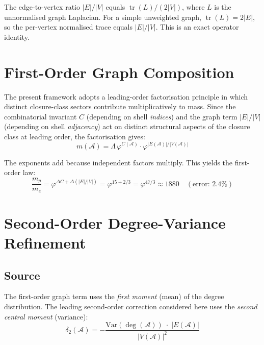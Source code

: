 \documentclass[12pt]{article}
\newcommand{\Acal}{\mathcal{A}}
\newcommand{\phig}{\varphi}
\begin{document}
The edge-to-vertex ratio $|E|/|V|$ equals $\operatorname{tr}(L)/(2|V|)$, where $L$ is the unnormalised graph Laplacian. For a simple unweighted graph, $\operatorname{tr}(L) = 2|E|$, so the per-vertex normalised trace equals $|E|/|V|$. This is an exact operator identity.

\section{First-Order Graph Composition}\label{sec:graphrule}

The present framework adopts a leading-order factorisation principle in which distinct closure-class sectors contribute multiplicatively to mass. Since the combinatorial invariant $C$ (depending on shell \textit{indices}) and the graph term $|E|/|V|$ (depending on shell \textit{adjacency}) act on distinct structural aspects of the closure class at leading order, the factorisation gives:
\begin{equation}
    m(\Acal) = \Lambda\, \phig^{C(\Acal)} \cdot \phig^{|E(\Acal)|/|V(\Acal)|}
\end{equation}

The exponents add because independent factors multiply. This yields the first-order law:
\begin{equation}\label{eq:first_order}
    \frac{m_p}{m_e} = \phig^{\Delta C + \Delta(|E|/|V|)} = \phig^{15 + 2/3} = \phig^{47/3} \approx 1880 \quad (\text{error: } 2.4\%)
\end{equation}

\section{Second-Order Degree-Variance Refinement}\label{sec:secondorder}

\subsection{Source}

The first-order graph term uses the \textit{first moment} (mean) of the degree distribution. The leading second-order correction considered here uses the \textit{second central moment} (variance):
\[
\delta_2(\Acal) = -\frac{\mathrm{Var}(\deg(\Acal))\;\cdot\;|E(\Acal)|}{|V(\Acal)|^2}
\]
\end{document}
